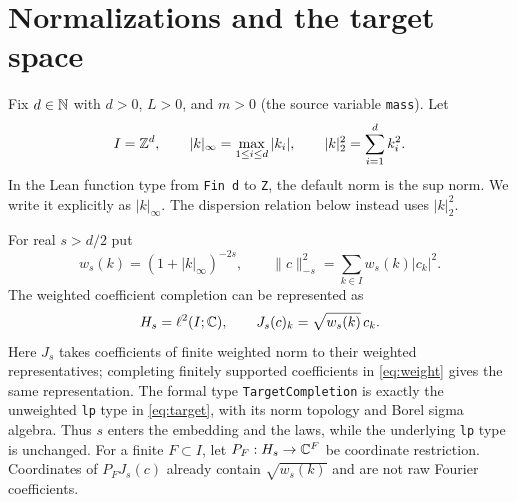 \documentclass[11pt]{amsart}
\theoremstyle{remark}\newtheorem{remark}[theorem]{Remark}
\begin{document}
\section{Normalizations and the target space}\label{sec:normalization}
Fix $d\in\mathbb N$ with $d>0$, $L>0$, and $m>0$ (the source variable \texttt{mass}). Let
\[
 I=\mathbb Z^d,\qquad |k|_\infty=\max_{1\le i\le d}|k_i|,
 \qquad |k|_2^2=\sum_{i=1}^d k_i^2.
\]
In the Lean function type from \texttt{Fin d} to \texttt{Z}, the default norm is the sup norm. We write it explicitly as $|k|_\infty$. The dispersion relation below instead uses $|k|_2^2$.

For real $s>d/2$ put
\begin{equation}\label{eq:weight}
 w_s(k)=(1+|k|_\infty)^{-2s},\qquad
 \|c\|_{-s}^2=\sum_{k\in I}w_s(k)|c_k|^2.
\end{equation}
The weighted coefficient completion can be represented as
\begin{equation}\label{eq:target}
 H_s=\ell^2(I;\mathbb C),\qquad
 J_s(c)_k=\sqrt{w_s(k)}\,c_k.
\end{equation}
Here $J_s$ takes coefficients of finite weighted norm to their weighted representatives; completing finitely supported coefficients in \eqref{eq:weight} gives the same representation. The formal type \texttt{TargetCompletion} is exactly the unweighted \texttt{lp} type in \eqref{eq:target}, with its norm topology and Borel sigma algebra. Thus $s$ enters the embedding and the laws, while the underlying \texttt{lp} type is unchanged. For a finite $F\subset I$, let $P_F:H_s\to\mathbb C^F$ be coordinate restriction. Coordinates of $P_FJ_s(c)$ already contain $\sqrt{w_s(k)}$ and are not raw Fourier coefficients.
\end{document}
